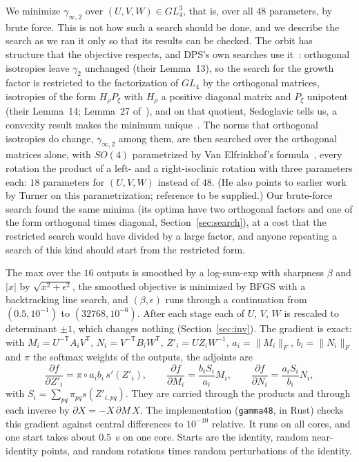 \documentclass[11pt]{article}
\theoremstyle{remark}
\newcommand{\ginf}{\gamma_{\infty,2}}
\begin{document}
We minimize $\ginf$ over $(U,V,W)\in GL_4^3$, that is, over all $48$
parameters, by brute force.  This is not how such a search should be
done, and we describe the search as we ran it only so that its results
can be checked.  The orbit has structure that the objective respects,
and DPS's own searches use it~\cite[Section~4]{DPS24}: orthogonal
isotropies leave $\gamma_2$ unchanged (their Lemma~13), so the search
for the growth factor is restricted to the factorization of $GL_4$ by
the orthogonal matrices, isotropies of the form $H_\rho P_\xi$ with
$H_\rho$ a positive diagonal matrix and $P_\xi$ unipotent (their
Lemma~14; Lemma~27 of~\cite{DPS26b}), and on that quotient, Sedoglavic tells us, a convexity result
makes the minimum unique~\cite{Sedoglavic26}.  The norms that
orthogonal isotropies do change, $\ginf$ among them, are then searched
over the orthogonal matrices alone, with $SO(4)$ parametrized by Van
Elfrinkhof's formula~\cite{vanElfrinkhof1897}, every rotation the
product of a left- and a right-isoclinic rotation with three parameters
each: $18$ parameters for $(U,V,W)$ instead of $48$.  (He also points to
earlier work by Turner on this parametrization; reference to be
supplied.)  Our brute-force search found the same minima (its optima
have two orthogonal factors and one of the form orthogonal times
diagonal, Section~\ref{sec:search}), at a cost that the restricted
search would have divided by a large factor, and anyone repeating a
search of this kind should start from the restricted form.

The max over the $16$
outputs is smoothed by a log-sum-exp with sharpness $\beta$ and
$\lvert x\rvert$ by $\sqrt{x^2+\epsilon^2}$, the smoothed objective is
minimized by BFGS with a backtracking line search, and $(\beta,\epsilon)$
runs through a continuation from $(0.5,10^{-1})$ to
$(32768,10^{-6})$.  After each stage each of $U$, $V$, $W$ is rescaled to
determinant $\pm1$, which changes nothing (Section~\ref{sec:inv}).  The
gradient is exact: with $M_i=U^{-\mathsf T}A_iV^{\mathsf T}$,
$N_i=V^{-\mathsf T}B_iW^{\mathsf T}$, $Z'_i=UZ_iW^{-1}$, $a_i=\lVert
M_i\rVert_F$, $b_i=\lVert N_i\rVert_F$ and $\pi$ the softmax weights
of the outputs, the adjoints are
\begin{equation}\label{eq:adjoints}
\frac{\partial f}{\partial Z'_i}=\pi\circ a_ib_i\,s'(Z'_i),\qquad
\frac{\partial f}{\partial M_i}=\frac{b_iS_i}{a_i}M_i,\qquad
\frac{\partial f}{\partial N_i}=\frac{a_iS_i}{b_i}N_i,
\end{equation}
with $S_i=\sum_{pq}\pi_{pq}s(Z'_{i,pq})$.  They are carried through the
products and through each inverse by $\partial X=-X\,\partial M\,X$.
The implementation (\texttt{gamma48}, in Rust) checks this gradient
against central differences to $10^{-10}$ relative.  It runs on all
cores, and one start takes about $0.5$~s on one core.  Starts are the
identity, random near-identity points, and random rotations times
random perturbations of the identity.
\end{document}
